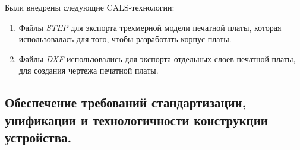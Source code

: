 Были внедрены следующие CALS-технологии:
\begin{enumerate}
\item Файлы \textit{STEP} для экспорта трехмерной модели печатной
платы, которая использовалась для того, чтобы разработать корпус
платы.

\item Файлы \textit{DXF} использовались для экспорта отдельных слоев
печатной платы, для создания чертежа печатной платы.
\end{enumerate}


\subsection{Обеспечение требований стандартизации, 
  унификации и технологичности конструкции устройства.}

\newpage

